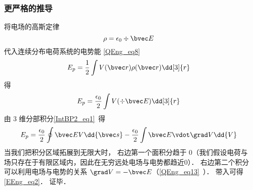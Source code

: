 \subsubsection{更严格的推导}

将电场的高斯定律
\begin{equation}
\rho = \epsilon_0\div \bvec E
\end{equation}
代入连续分布电荷系统的电势能 \autoref{QEng_eq8}~
\begin{equation}
E_p = \frac 12 \int V(\bvec r) \rho(\bvec r) \dd[3]{r}
\end{equation}
得
\begin{equation}
E_p = \frac{\epsilon_0}2 \int V (\div \bvec E) \dd[3]{r}
\end{equation}
由 3 维分部积分\autoref{IntBP2_eq1}~得
\begin{equation}
E_p = \frac{\epsilon_0}2 \oint \bvec E V \dd{\bvec s} - \frac{\epsilon_0}{2} \int \bvec E \vdot \grad V \dd{V}
\end{equation}
当我们把积分区域拓展到无限大时， 右边第一个面积分趋于 0（我们假设电荷与场只存在于有限区域内，因此在无穷远处电场与电势都趋近$0$）． 右边第二个积分可以利用电场与电势的关系 $\grad V = -\bvec E$（\autoref{QEng_eq13}~）． 带入可得\autoref{EEng_eq2}． 证毕．
